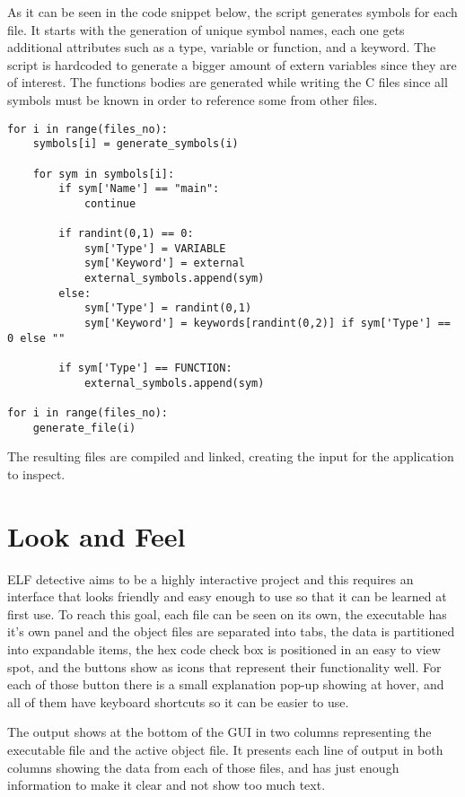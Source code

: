 As it can be seen in the code snippet below, the script generates symbols for each file. It starts with the generation of unique symbol names, each one gets additional attributes such as a type, variable or function, and a keyword. The script is hardcoded to generate a bigger amount of extern variables since they are of interest. The functions bodies are generated while writing the C files since all symbols must be known in order to reference some from other files.
\bigbreak
\lstset{language=python,caption=Core code of the test generator,label=lst:test-gen-code}
\begin{lstlisting}
for i in range(files_no):
	symbols[i] = generate_symbols(i)

	for sym in symbols[i]:
		if sym['Name'] == "main":
			continue 
		
		if randint(0,1) == 0:
			sym['Type'] = VARIABLE 
			sym['Keyword'] = external 
			external_symbols.append(sym) 
		else: 
			sym['Type'] = randint(0,1) 
			sym['Keyword'] = keywords[randint(0,2)] if sym['Type'] == 0 else "" 
		
		if sym['Type'] == FUNCTION: 
			external_symbols.append(sym)

for i in range(files_no):
	generate_file(i)
\end{lstlisting}

The resulting files are compiled and linked, creating the input for the application to inspect.

\section{Look and Feel}
\label{sec:look-feel}

ELF detective aims to be a highly interactive project and this requires an interface that looks friendly and easy enough to use so that it can be learned at first use. To reach this goal, each file can be seen on its own, the executable has it's own panel and the object files are separated into tabs, the data is partitioned into expandable items, the hex code check box is positioned in an easy to view spot, and the buttons show as icons that represent their functionality well. For each of those button there is a small explanation pop-{}up showing at hover, and all of them have keyboard shortcuts so it can be easier to use. 

The output shows at the bottom of the GUI in two columns representing the executable file and the active object file. It presents each line of output in both columns showing the data from each of those files, and has just enough information to make it clear and not show too much text.

